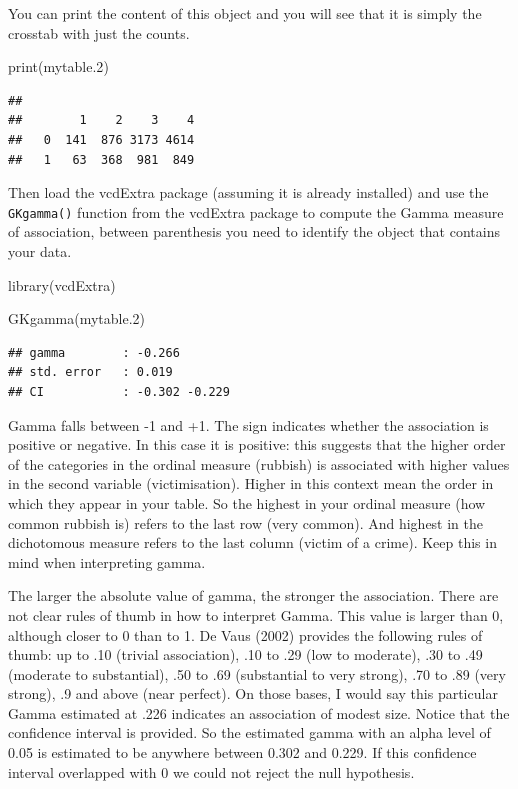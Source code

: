 \documentclass[
]{book}
\newenvironment{Shaded}{\begin{snugshade}}{\end{snugshade}}
\newcommand{\FloatTok}[1]{\textcolor[rgb]{0.00,0.00,0.81}{#1}}
\newcommand{\FunctionTok}[1]{\textcolor[rgb]{0.00,0.00,0.00}{#1}}
\newcommand{\NormalTok}[1]{#1}
\begin{document}
You can print the content of this object and you will see that it is simply the crosstab with just the counts.

\begin{Shaded}
\begin{Highlighting}[]
\FunctionTok{print}\NormalTok{(mytable}\FloatTok{.2}\NormalTok{) }
\end{Highlighting}
\end{Shaded}

\begin{verbatim}
##    
##        1    2    3    4
##   0  141  876 3173 4614
##   1   63  368  981  849
\end{verbatim}

Then load the vcdExtra package (assuming it is already installed) and use the \texttt{GKgamma()} function from the vcdExtra package to compute the Gamma measure of association, between parenthesis you need to identify the object that contains your data.

\begin{Shaded}
\begin{Highlighting}[]
\FunctionTok{library}\NormalTok{(vcdExtra) }

\FunctionTok{GKgamma}\NormalTok{(mytable}\FloatTok{.2}\NormalTok{) }
\end{Highlighting}
\end{Shaded}

\begin{verbatim}
## gamma        : -0.266 
## std. error   : 0.019 
## CI           : -0.302 -0.229
\end{verbatim}

Gamma falls between -1 and +1. The sign indicates whether the association is positive or negative. In this case it is positive: this suggests that the higher order of the categories in the ordinal measure (rubbish) is associated with higher values in the second variable (victimisation). Higher in this context mean the order in which they appear in your table. So the highest in your ordinal measure (how common rubbish is) refers to the last row (very common). And highest in the dichotomous measure refers to the last column (victim of a crime). Keep this in mind when interpreting gamma.

The larger the absolute value of gamma, the stronger the association. There are not clear rules of thumb in how to interpret Gamma. This value is larger than 0, although closer to 0 than to 1. De Vaus (2002) provides the following rules of thumb: up to .10 (trivial association), .10 to .29 (low to moderate), .30 to .49 (moderate to substantial), .50 to .69 (substantial to very strong), .70 to .89 (very strong), .9 and above (near perfect). On those bases, I would say this particular Gamma estimated at .226 indicates an association of modest size. Notice that the confidence interval is provided. So the estimated gamma with an alpha level of 0.05 is estimated to be anywhere between 0.302 and 0.229. If this confidence interval overlapped with 0 we could not reject the null hypothesis.
\end{document}
